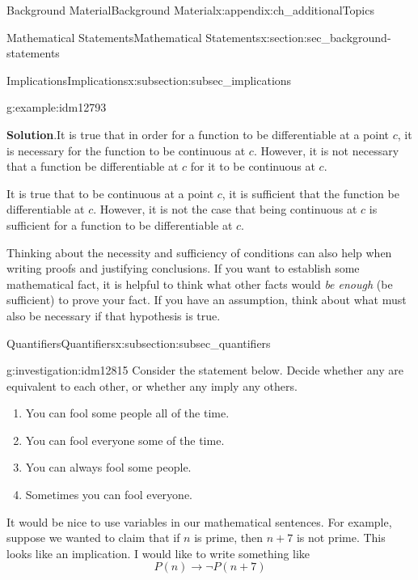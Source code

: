 \documentclass[oneside,10pt,]{book}
\numberwithin{equation}{chapter}
\def\imp{\rightarrow}
\begin{document}
\begin{appendixptx}{Background Material}{}{Background Material}{}{}{x:appendix:ch_additionalTopics}
\begin{sectionptx}{Mathematical Statements}{}{Mathematical Statements}{}{}{x:section:sec_background-statements}
\begin{subsectionptx}{Implications}{}{Implications}{}{}{x:subsection:subsec_implications}
\begin{example}{}{g:example:idm12793}
\par\smallskip%
\noindent\textbf{Solution}.\hypertarget{g:solution:idm12800}{}\quad{}It is true that in order for a function to be differentiable at a point \(c\), it is necessary for the function to be continuous at \(c\). However, it is not necessary that a function be differentiable at \(c\) for it to be continuous at \(c\).%
\par
It is true that to be continuous at a point \(c\), it is sufficient that the function be differentiable at \(c\). However, it is not the case that being continuous at \(c\) is sufficient for a function to be differentiable at \(c\).%
\end{example}
Thinking about the necessity and sufficiency of conditions can also help when writing proofs and justifying conclusions. If you want to establish some mathematical fact, it is helpful to think what other facts would \emph{be enough} (be sufficient) to prove your fact. If you have an assumption, think about what must also be necessary if that hypothesis is true.%
\end{subsectionptx}
%
%
\typeout{************************************************}
\typeout{************************************************}
%
\begin{subsectionptx}{Quantifiers}{}{Quantifiers}{}{}{x:subsection:subsec_quantifiers}
\begin{investigation}{}{g:investigation:idm12815}%
Consider the statement below. Decide whether any are equivalent to each other, or whether any imply any others.%
\par
%
\begin{enumerate}
\item{}You can fool some people all of the time.%
\item{}You can fool everyone some of the time.%
\item{}You can always fool some people.%
\item{}Sometimes you can fool everyone.%
\end{enumerate}
%
\end{investigation}
It would be nice to use variables in our mathematical sentences. For example, suppose we wanted to claim that if \(n\) is prime, then \(n+7\) is not prime. This looks like an implication. I would like to write something like%
\begin{equation*}
P(n) \imp \neg P(n+7) 
\end{equation*}

\end{subsectionptx}
\end{sectionptx}
\end{appendixptx}
\end{document}
